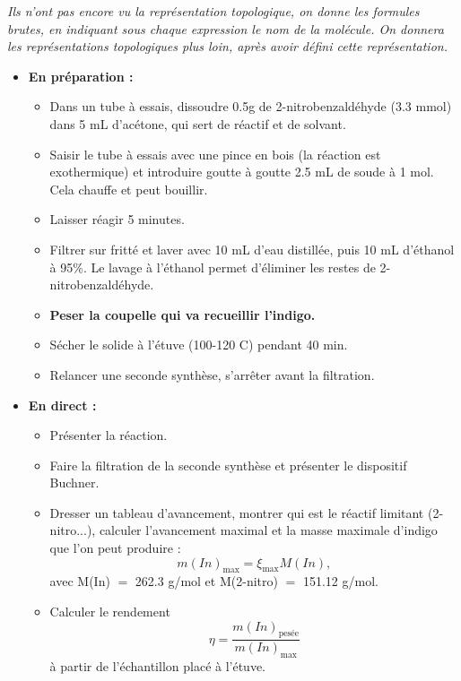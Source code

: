 \documentclass[11pt,a4paper]{report}
\begin{document}
\textit{Ils n'ont pas encore vu la représentation topologique, on donne les formules brutes, en indiquant sous chaque expression le nom de la molécule. On donnera les représentations topologiques plus loin, après avoir défini cette représentation.}\\

\begin{itemize}
	\item \textbf{En préparation :}
	\begin{itemize}
		\item Dans un tube à essais, dissoudre 0.5g de 2-nitrobenzaldéhyde (3.3 mmol) dans 5 mL 					d'acétone, qui sert de réactif et de solvant.
		\item Saisir le tube à essais avec une pince en bois (la réaction est exothermique) et 						introduire goutte à goutte 2.5 mL de soude à 1 mol. Cela chauffe et peut bouillir.
		\item Laisser réagir 5 minutes.
		\item Filtrer sur fritté et laver avec 10 mL d'eau distillée, puis 10 mL d'éthanol à 95\%. Le 				lavage à l'éthanol permet d'éliminer les restes de 2-nitrobenzaldéhyde.
		\item \textbf{Peser la coupelle qui va recueillir l'indigo.}
		\item Sécher le solide à l'étuve (100-120 \degree C) pendant 40 min.
		\item Relancer une seconde synthèse, s'arrêter avant la filtration.\\
	\end{itemize}
	
	\item \textbf{En direct :}
	\begin{itemize}
		\item Présenter la réaction.
		\item Faire la filtration de la seconde synthèse et présenter le dispositif Buchner.
		\item Dresser un tableau d'avancement, montrer qui est le réactif limitant (2-nitro...), 					calculer l'avancement maximal et la masse maximale d'indigo que l'on peut produire :
		\begin{equation}
			m(In)_\text{max} = \xi_\text{max} M(In),
		\end{equation}
		avec M(In) $=$ 262.3 g/mol et M(2-nitro) $=$ 151.12 g/mol.
		
		\item Calculer le rendement 
		\begin{equation}
			\eta = \frac{m(In)_\text{pesée}}{m(In)_\text{max}}
		\end{equation}
		à partir de l'échantillon placé à l'étuve.
	\end{itemize}
\end{itemize}
\end{document}
